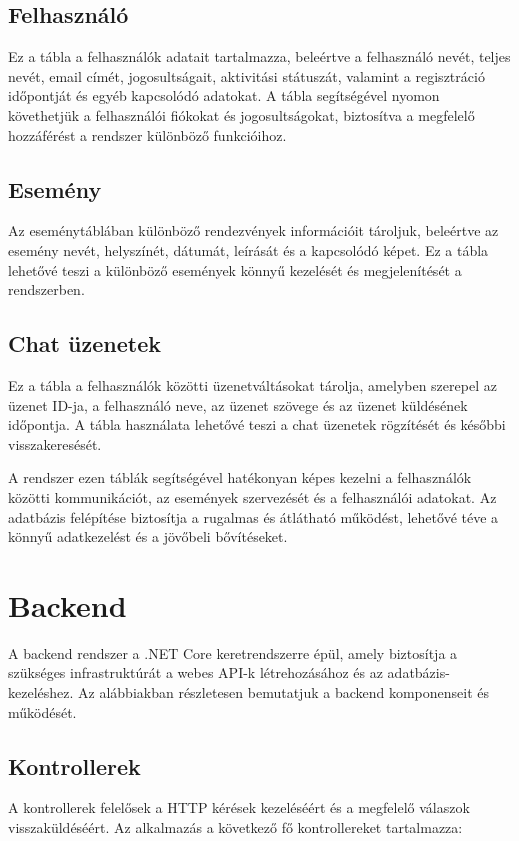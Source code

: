 \documentclass[colorlinks]{thesis-kando}
\theoremstyle{definition}
\theoremstyle{remark}
\begin{document}
\subsection{Felhasználó}
Ez a tábla a felhasználók adatait tartalmazza, beleértve a felhasználó nevét, teljes nevét, email címét, jogosultságait, aktivitási státuszát, valamint a regisztráció időpontját és egyéb kapcsolódó adatokat. A tábla segítségével nyomon követhetjük a felhasználói fiókokat és jogosultságokat, biztosítva a megfelelő hozzáférést a rendszer különböző funkcióihoz.

\subsection{Esemény}
Az eseménytáblában különböző rendezvények információit tároljuk, beleértve az esemény nevét, helyszínét, dátumát, leírását és a kapcsolódó képet. Ez a tábla lehetővé teszi a különböző események könnyű kezelését és megjelenítését a rendszerben.

\subsection{Chat üzenetek}
Ez a tábla a felhasználók közötti üzenetváltásokat tárolja, amelyben szerepel az üzenet ID-ja, a felhasználó neve, az üzenet szövege és az üzenet küldésének időpontja. A tábla használata lehetővé teszi a chat üzenetek rögzítését és későbbi visszakeresését.

\noindent 
A rendszer ezen táblák segítségével hatékonyan képes kezelni a felhasználók közötti kommunikációt, az események szervezését és a felhasználói adatokat. Az adatbázis felépítése biztosítja a rugalmas és átlátható működést, lehetővé téve a könnyű adatkezelést és a jövőbeli bővítéseket.

 \section{Backend}
 
 A backend rendszer a .NET Core keretrendszerre épül, amely biztosítja a szükséges infrastruktúrát a webes API-k létrehozásához és az adatbázis-kezeléshez. Az alábbiakban részletesen bemutatjuk a backend komponenseit és működését.
 
 \subsection{Kontrollerek}
 
 A kontrollerek felelősek a HTTP kérések kezeléséért és a megfelelő válaszok visszaküldéséért. Az alkalmazás a következő fő kontrollereket tartalmazza:
 
\end{document}
